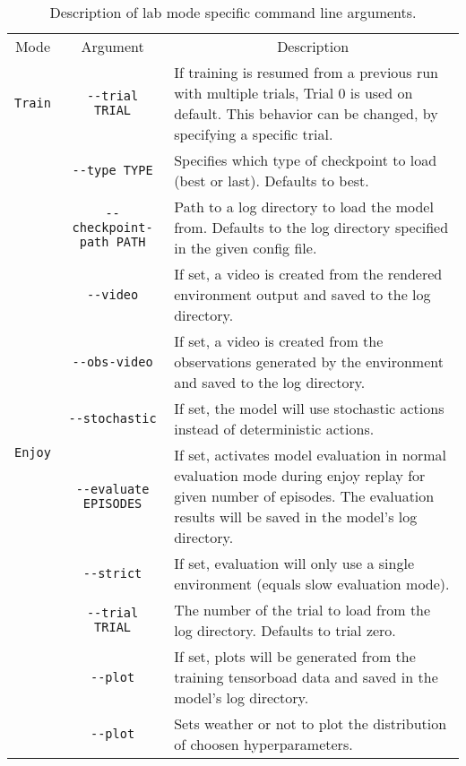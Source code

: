 \begin{table}[ht]
    \begin{center}
        \small
        \bgroup
        \def\arraystretch{1.25}%
        \begin{tabular}{|c|c|p{}|}
            \hline
            Mode & Argument & \multicolumn{1}{c|}{Description} \\
            \hhline{|=|=|=|}
            \texttt{Train} & \texttt{-{}-trial TRIAL} & If training is resumed from a previous run with multiple trials, Trial 0 is used on default. This behavior can be changed, by specifying a specific trial. \\
            \hline
            \multirow{15}{*}{\texttt{Enjoy}} & \texttt{-{}-type TYPE} & Specifies which type of checkpoint to load (best or last). Defaults to best. \\
            & \texttt{-{}-checkpoint-path PATH} & Path to a log directory to load the model from. Defaults to the log directory specified in the given config file. \\
            & \texttt{-{}-video} & If set, a video is created from the rendered environment output and saved to the log directory. \\
            & \texttt{-{}-obs-video} & If set, a video is created from the observations generated by the environment and saved to the log directory. \\
            & \texttt{-{}-stochastic} & If set, the model will use stochastic actions instead of deterministic actions. \\
            & \texttt{-{}-evaluate EPISODES} & If set, activates model evaluation in normal evaluation mode during enjoy replay for given number of episodes. The evaluation results will be saved in the model's log directory. \\
            & \texttt{-{}-strict} & If set, evaluation will only use a single environment (equals slow evaluation mode). \\
            & \texttt{-{}-trial TRIAL} & The number of the trial to load from the log directory. Defaults to trial zero. \\
            & \texttt{-{}-plot} & If set, plots will be generated from the training tensorboad data and saved in the model's log directory.\\
            \hline
            \texttt{Search} & \texttt{-{}-plot} & Sets weather or not to plot the distribution of choosen hyperparameters. \\
            \hline
        \end{tabular}
        \egroup
    \end{center}
    \caption[Mode Specific Command Line Arguments]{Description of lab mode specific command line arguments.} \label{tab:CommandLineArguments}
\end{table}